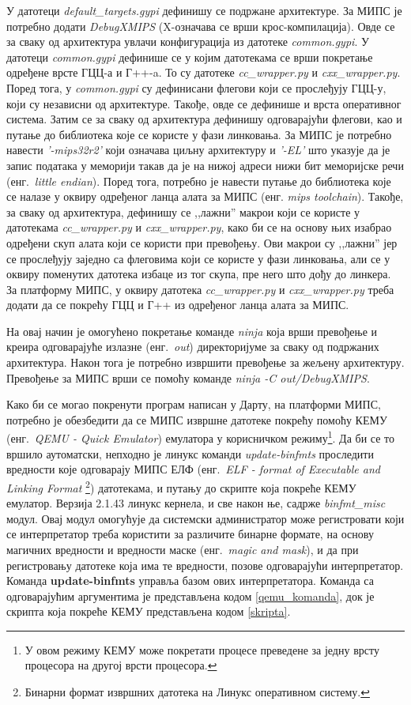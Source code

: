 \documentclass[12pt,oneside]{memoir}
\begin{document}
У датотеци \textit{default\_targets.gypi} дефинишу се подржане архитектуре. За МИПС је потребно додати \textit{DebugXMIPS} (X-означава се врши крос-компилација). Овде се за сваку од архитектура увлачи конфигурација из датотеке \textit{common.gypi}. У датотеци \textit{common.gypi} дефинише се у којим датотекама се врши покретање одређене врсте ГЦЦ-а и Г++-a. То су датотеке \textit{cc\_wrapper.py} и \textit{cxx\_wrapper.py}. Поред тога, у \textit{common.gypi} су дефинисани флегови који се прослеђују ГЦЦ-у, који су независни од архитектуре. Такође, овде се дефинише и врста оперативног система. Затим се за сваку од архитектура дефинишу одговарајући флегови, као и путање до библиотека које се користе у фази линковања. За МИПС је потребно навести \textit{'-mips32r2'} који означава циљну архитектуру и \textit{'-EL'} што указује да је запис података у меморији такав да је на нижој адреси нижи бит меморијске речи (енг.~\textit{little endian}). Поред тога, потребно је навести путање до библиотека које се налазе у оквиру одређеног ланца алата за МИПС (енг. \textit{mips toolchain}). Такође, за сваку од архитектура, дефинишу се ,,лажни'' макрои који се користе у датотекама \textit{cc\_wrapper.py} и \textit{cxx\_wrapper.py}, како би се на основу њих изабрао одређени скуп алата који се користи при превођењу. Ови макрои су ,,лажни'' јер се прослеђују заједно са флеговима који се користе у фази линковања, али се у оквиру поменутих датотека избаце из тог скупа, пре него што дођу до линкера. За платформу МИПС, у оквиру датотека \textit{cc\_wrapper.py} и \textit{cxx\_wrapper.py} треба додати да се покрећу ГЦЦ и Г++ из одређеног ланца алата за МИПС.

На овај начин је омогућено покретање команде \textit{ninja} која врши превођење и креира одговарајуће излазне (енг.~\textit{out}) директоријуме за сваку од подржаних архитектура. Након тога је потребно извршити превођење за жељену архитектуру. Превођење за МИПС врши се помоћу команде \textit{ninja -C out/DebugXMIPS}.

Како би се могао покренути програм написан у Дарту, на платформи МИПС, потребно је обезбедити да се МИПС извршне датотеке покрећу помоћу КЕМУ (енг.~\textit{QEMU - Quick Emulator}) емулатора у корисничком режиму\footnote{У овом режиму КЕМУ може покретати процесе преведене за једну врсту процесора на другој врсти процесора.}. Да би се то вршило аутоматски, непходно је линукс команди \textit{update-binfmts} проследити вредности које одговарају МИПС ЕЛФ (енг.~\textit{ELF - format of Executable and Linking Format} \footnote{Бинарни формат извршних датотека на Линукс оперативном систему.}) датотекама, и путању до скрипте која покреће КЕМУ емулатор. Верзија 2.1.43 линукс кернела, и све након ње, садрже \textit{binfmt\_misc} модул. Овај модул омогућује да системски администратор може регистровати који се интерпретатор треба користити за различите бинарне формате, на основу магичних вредности и вредности маске (енг.~\textit{magic and mask}), и да при регистровању датотеке која има те вредности, позове одговарајући интерпретатор. Команда \textbf{update-binfmts} управља базом ових интерпретатора. Команда са одговарајућим аргументима је представљена кодом \ref{qemu_komanda}, док је скрипта која покреће КЕМУ представљена кодом \ref{skripta}. \\
\end{document}
